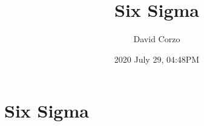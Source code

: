 \documentclass[openany]{book}
\title{Six Sigma}
\date{2020 July 29, 04:48PM}
\author{David Corzo} %
\begin{document}
\maketitle

\chapter{Six Sigma}



\end{document}
